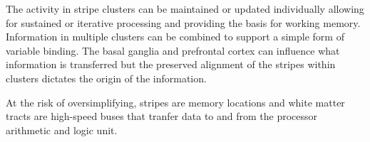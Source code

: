 The activity in stripe clusters can be maintained or updated individually allowing for sustained or iterative processing and providing the basis for working memory. Information in multiple clusters can be combined to support a simple form of variable binding. The basal ganglia and prefrontal cortex can influence what information is transferred but the preserved alignment of the stripes within clusters dictates the origin of the information.

At the risk of oversimplifying, stripes are memory locations and white matter tracts are high-speed buses that tranfer data to and from the processor arithmetic and logic unit.

